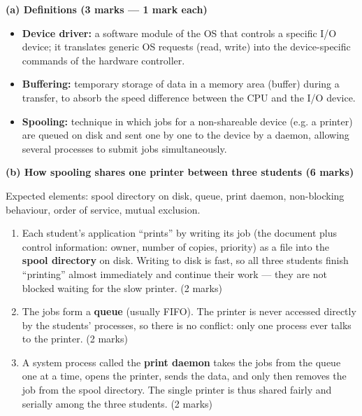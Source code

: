 \documentclass[11pt]{article}
\begin{document}
\begin{corrige}
\textbf{(a) Definitions (3 marks — 1 mark each)}
\begin{itemize}
\item \textbf{Device driver:} a software module of the OS that controls a specific I/O device; it translates generic OS requests (read, write) into the device-specific commands of the hardware controller.
\item \textbf{Buffering:} temporary storage of data in a memory area (buffer) during a transfer, to absorb the speed difference between the CPU and the I/O device.
\item \textbf{Spooling:} technique in which jobs for a non-shareable device (e.g. a printer) are queued on disk and sent one by one to the device by a daemon, allowing several processes to submit jobs simultaneously.
\end{itemize}

\textbf{(b) How spooling shares one printer between three students (6 marks)}

Expected elements: spool directory on disk, queue, print daemon, non-blocking behaviour, order of service, mutual exclusion.

\begin{enumerate}
\item Each student's application ``prints'' by writing its job (the document plus control information: owner, number of copies, priority) as a file into the \textbf{spool directory} on disk. Writing to disk is fast, so all three students finish ``printing'' almost immediately and continue their work — they are not blocked waiting for the slow printer. (2 marks)
\item The jobs form a \textbf{queue} (usually FIFO). The printer is never accessed directly by the students' processes, so there is no conflict: only one process ever talks to the printer. (2 marks)
\item A system process called the \textbf{print daemon} takes the jobs from the queue one at a time, opens the printer, sends the data, and only then removes the job from the spool directory. The single printer is thus shared fairly and serially among the three students. (2 marks)
\end{enumerate}


\end{corrige}
\end{document}
